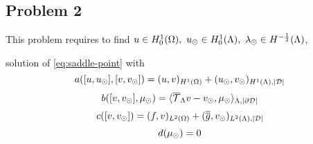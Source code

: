 \subsection{Problem 2}
This problem requires to find $u \in H^1_0(\Omega),\ u_{\odot} \in H^1_0(\Lambda), \ \lambda_{\odot} \in H^{-\frac12}(\Lambda)$, %

solution of \eqref{eq:saddle-point} with
\begin{equation*}
a([u, u_{\odot}], [v, v_{\odot}])= (u,v)_{H^1(\Omega)} + (u_{\odot},v_{\odot})_{H^1(\Lambda),|\mathcal{D}|}
\end{equation*} 
\begin{equation*}
b([v, v_{\odot}], \mu_{\odot})=  \langle  {\overline{\mathcal{T}}_\Lambda} v - v_{\odot}, \mu_{\odot} \rangle_{\Lambda, |\partial\mathcal{D}|} 
\end{equation*} 
\begin{equation*}
c([v,v_{\odot}])= (f,v)_{L^2(\Omega)} + (\overline{\overline{g}},v_{\odot})_{L^2(\Lambda),|\mathcal{D}|}
\end{equation*}
\begin{equation*}
d(\mu_{\odot})=0
\end{equation*}



